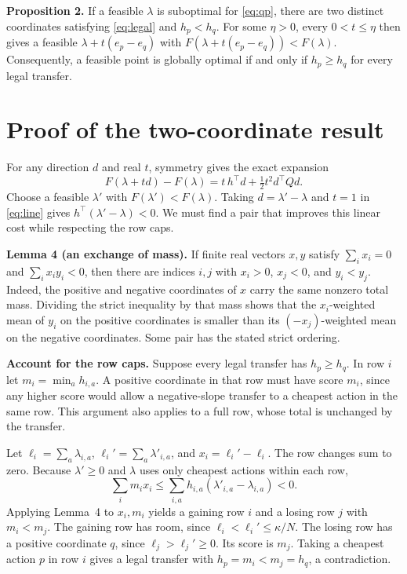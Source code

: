 \documentclass[12pt,a4paper]{article}
\newcommand{\lead}[1]{\par\smallskip\noindent\textbf{#1}\enspace}
\begin{document}
\textbf{Proposition 2.} If a feasible \(\lambda\) is suboptimal for
\eqref{eq:qp}, there are two distinct coordinates satisfying \eqref{eq:legal}
and \(h_p<h_q\). For some \(\eta>0\), every \(0<t\le\eta\) then gives a
feasible \(\lambda+t(e_p-e_q)\) with \(F(\lambda+t(e_p-e_q))<F(\lambda)\).
Consequently, a feasible point is globally optimal if and only if
\(h_p\ge h_q\) for every legal transfer.

\newpage
\section*{Proof of the two-coordinate result}
For any direction \(d\) and real \(t\), symmetry gives the exact expansion
\begin{equation}
 F(\lambda+td)-F(\lambda)=t\,h^\top d+\tfrac12t^2d^\top Qd .
 \tag{A}\label{eq:line}
\end{equation}
Choose a feasible \(\lambda'\) with \(F(\lambda')<F(\lambda)\).
Taking \(d=\lambda'-\lambda\) and \(t=1\) in \eqref{eq:line} gives
\(h^\top(\lambda'-\lambda)<0\). We must find a pair that improves this
linear cost while respecting the row caps.

\lead{Lemma 4 (an exchange of mass).} If finite real vectors \(x,y\)
satisfy \(\sum_i x_i=0\) and \(\sum_i x_i y_i<0\), then there are
indices \(i,j\) with \(x_i>0\), \(x_j<0\), and \(y_i<y_j\).
Indeed, the positive and negative coordinates of \(x\) carry the same
nonzero total mass. Dividing the strict inequality by that mass
shows that the \(x_i\)-weighted mean of \(y_i\) on the positive
coordinates is smaller than its \((-x_j)\)-weighted mean on the
negative coordinates. Some pair has the stated strict ordering.

\lead{Account for the row caps.}
Suppose every legal transfer has \(h_p\ge h_q\). In row \(i\) let
\(m_i=\min_a h_{i,a}\). A positive coordinate in that row must have
score \(m_i\), since any higher score would allow a negative-slope
transfer to a cheapest action in the same row. This argument
also applies to a full row, whose total is unchanged by the transfer.

Let \(\ell_i=\sum_a\lambda_{i,a}\), \(\ell_i'=\sum_a\lambda'_{i,a}\),
and \(x_i=\ell_i'-\ell_i\). The row changes sum to zero. Because
\(\lambda'\ge0\) and \(\lambda\) uses only cheapest actions within each row,
\[
 \sum_i m_i x_i
 \le \sum_{i,a}h_{i,a}(\lambda'_{i,a}-\lambda_{i,a})<0 .
\]
Applying Lemma~4 to \(x_i,m_i\) yields a gaining row \(i\) and a losing
row \(j\) with \(m_i<m_j\). The gaining row has room, since
\(\ell_i<\ell_i'\le\kappa/N\). The losing row has a positive coordinate
\(q\), since \(\ell_j>\ell_j'\ge0\). Its score is \(m_j\). Taking a
cheapest action \(p\) in row \(i\) gives a legal transfer with
\(h_p=m_i<m_j=h_q\), a contradiction.
\end{document}
